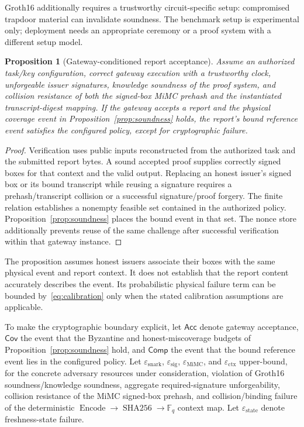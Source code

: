 \documentclass[preprint,review,12pt]{elsarticle}
\newtheorem{proposition}{Proposition}
\begin{document}
Groth16 additionally requires a trustworthy circuit-specific setup: compromised trapdoor material can invalidate soundness. The benchmark setup is experimental only; deployment needs an appropriate ceremony or a proof system with a different setup model.

\begin{proposition}[Gateway-conditioned report acceptance]\label{prop:gateway}
Assume an authorized task/key configuration, correct gateway execution with a trustworthy clock, unforgeable issuer signatures, knowledge soundness of the proof system, and collision resistance of both the signed-box MiMC prehash and the instantiated transcript-digest mapping. If the gateway accepts a report and the physical coverage event in Proposition~\ref{prop:soundness} holds, the report's bound reference event satisfies the configured policy, except for cryptographic failure.
\end{proposition}
\begin{proof}
Verification uses public inputs reconstructed from the authorized task and the submitted report bytes. A sound accepted proof supplies correctly signed boxes for that context and the valid output. Replacing an honest issuer's signed box or its bound transcript while reusing a signature requires a prehash/transcript collision or a successful signature/proof forgery. The finite relation establishes a nonempty feasible set contained in the authorized policy. Proposition~\ref{prop:soundness} places the bound event in that set. The nonce store additionally prevents reuse of the same challenge after successful verification within that gateway instance.\end{proof}
The proposition assumes honest issuers associate their boxes with the same physical event and report context. It does not establish that the report content accurately describes the event. Its probabilistic physical failure term can be bounded by~\eqref{eq:calibration} only when the stated calibration assumptions are applicable.

To make the cryptographic boundary explicit, let $\mathsf{Acc}$ denote gateway acceptance, $\mathsf{Cov}$ the event that the Byzantine and honest-miscoverage budgets of Proposition~\ref{prop:soundness} hold, and $\mathsf{Comp}$ the event that the bound reference event lies in the configured policy. Let $\varepsilon_{\mathrm{snark}}$, $\varepsilon_{\mathrm{sig}}$, $\varepsilon_{\mathrm{MiMC}}$, and $\varepsilon_{\mathrm{ctx}}$ upper-bound, for the concrete adversary resources under consideration, violation of Groth16 soundness/knowledge soundness, aggregate required-signature unforgeability, collision resistance of the MiMC signed-box prehash, and collision/binding failure of the deterministic $\operatorname{Encode}\rightarrow\operatorname{SHA256}\rightarrow\mathbb{F}_q$ context map. Let $\varepsilon_{\mathrm{state}}$ denote freshness-state failure.
\end{document}
